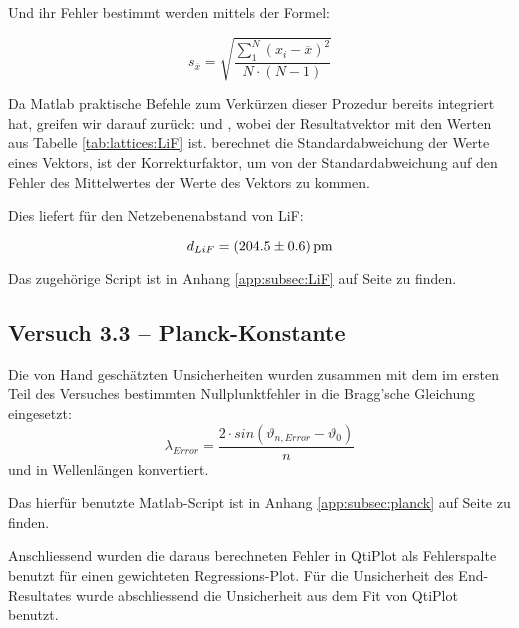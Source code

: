 Und ihr Fehler bestimmt werden mittels der Formel:

\begin{equation*}
    s_{\overline{x}} = \sqrt{ \frac{\sum_{1}^{N}{(x_i-\overline{x})^2}}{N \cdot (N-1)}}
\end{equation*}

Da  Matlab   praktische  Befehle  zum  Verk\"urzen   dieser  Prozedur  bereits
integriert hat,  greifen wir darauf zur\"uck:   und ,  wobei    der  Resultatvektor  mit  den  Werten
aus  Tabelle  \ref{tab:lattices:LiF}  ist.    berechnet  die
Standardabweichung der  Werte eines Vektors,   ist der
Korrekturfaktor, um von der Standardabweichung auf den Fehler des Mittelwertes
der Werte des Vektors zu kommen.

Dies liefert f\"ur den Netzebenenabstand von LiF:

\begin{equation*}
    d_{LiF} = \SI{204.5 \pm 0.6}{\pico\meter}
\end{equation*}

Das  zugeh\"orige   Script  ist  in  Anhang   \ref{app:subsec:LiF}  auf  Seite
\pageref{app:subsec:LiF} zu finden.


\subsection{Versuch 3.3 -- Planck-Konstante}
\label{subsec:error:planck}

Die von  Hand gesch\"atzten Unsicherheiten  wurden zusammen mit dem  im ersten
Teil  des Versuches  bestimmten Nullplunktfehler  in die  Bragg'sche Gleichung
eingesetzt:
$$\lambda_{Error}  =  \frac{2  \cdot sin  \left(\vartheta_{n,Error}  -  \vartheta_0 \right)}{n}$$
und  in  Wellenl\"angen  konvertiert.

Das hierf\"ur benutzte Matlab-Script ist in Anhang \ref{app:subsec:planck} auf
Seite \pageref{app:subsec:planck} zu finden.

Anschliessend wurden die daraus berechneten Fehler in QtiPlot als Fehlerspalte
benutzt f\"ur einen gewichteten  Regressions-Plot.  F\"ur die Unsicherheit des
End-Resultates wurde  abschliessend die Unsicherheit  aus dem Fit  von QtiPlot
benutzt.


\clearpage
